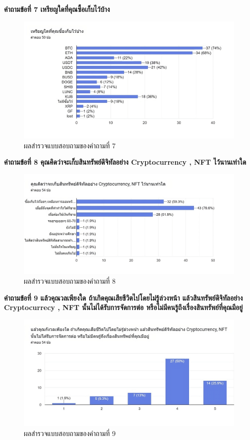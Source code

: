 \documentclass[12pt,oneside,openright,a4paper]{cpe-thai-project}
\begin{document}
\clearpage

\bf คำถามข้อที่ 7 เหรียญใดที่คุณซื้อเก็บไว้บ้าง\\
\begin{figure}[!thb]
			\centering
			\includegraphics[scale=0.3]{apprex7}
			\caption{ผลสำรวจแบบสอบถามของคำถามที่ 7}
		\end{figure}
\FloatBarrier


\bf คำถามข้อที่ 8 คุณคิดว่าจะเก็บสินทรัพย์ดิจิทัลอย่าง Cryptocurrency , NFT ไว้นานเท่าใด\\
\begin{figure}[!thb]
			\centering
			\includegraphics[scale=0.3]{apprex8}
			\caption{ผลสำรวจแบบสอบถามของคำถามที่ 8}
		\end{figure}
\FloatBarrier

\clearpage
\bf คำถามข้อที่ 9  แล้วคุณวลเพียงใด ถ้าเกิดคุณเสียชีวิตไปโดยไม่รู้ล่วงหน้า แล้วสินทรัพย์ดิจิทัลอย่าง Cryptocurrecy , NFT นั้นไม่ได้รับการจัดการต่อ หรือไม่มีคนรู้ถึงเรื่องสินทรัพย์ที่คุณมีอยู่\\
\begin{figure}[!thb]
			\centering
			\includegraphics[scale=0.3]{apprex9}
			\caption{ผลสำรวจแบบสอบถามของคำถามที่ 9}
		\end{figure}
\FloatBarrier
\end{document}

